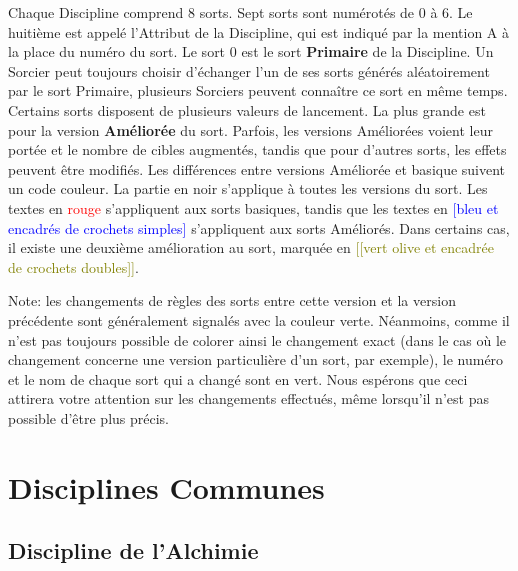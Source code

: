 \documentclass[a4paper,8pt]{extarticle}
\newcommand{\amel}[1]{\textcolor{blue}{[#1]}}
\newcommand{\base}{\textcolor{red}}
\newcommand{\amelbis}[1]{\textcolor{olive}{[[#1]]}}
\newcommand{\newrule}{\textcolor{green!50!black}}
\begin{document}
{Chaque Discipline comprend 8 sorts. Sept sorts sont numérotés de 0 à 6. Le huitième est appelé l’Attribut de la Discipline, qui est indiqué par la mention \og A \fg{} à la place du numéro du sort. Le sort 0 est le sort \textbf{Primaire} de la Discipline. Un Sorcier peut toujours choisir d'échanger l'un de ses sorts générés aléatoirement par le sort Primaire, plusieurs Sorciers peuvent connaître ce sort en même temps. Certains sorts disposent de plusieurs valeurs de lancement. La plus grande est pour la version \textbf{Améliorée} du sort. Parfois, les versions Améliorées voient leur portée et le nombre de cibles augmentés, tandis que pour d'autres sorts, les effets peuvent être modifiés. Les différences entre versions Améliorée et basique suivent un code couleur. La partie en noir s'applique à toutes les versions du sort. Les textes en \base{rouge} s'appliquent aux sorts basiques, tandis que les textes en \amel{bleu et encadrés de crochets simples} s'appliquent aux sorts Améliorés. Dans certains cas, il existe une deuxième amélioration au sort, marquée en \amelbis{vert olive et encadrée de crochets doubles}. 

\vspace{1cm}
\noindent Note: les changements de règles des sorts entre cette version et la version précédente sont généralement signalés avec \newrule{la couleur verte}. Néanmoins, comme il n'est pas toujours possible de colorer ainsi le changement exact (dans le cas où le changement concerne une version particulière d'un sort, par exemple), le numéro et le nom de chaque sort qui a changé sont \newrule{en vert}. Nous espérons que ceci attirera votre attention sur les changements effectués, même lorsqu'il n'est pas possible d'être plus précis.
}
\clearpage

\section{Disciplines Communes}

\subsection{Discipline de l'Alchimie}
\end{document}

